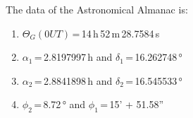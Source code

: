 The data of the Astronomical Almanac is: 

\begin{enumerate}
    \item $\Theta_G(0UT)$\,=\,14\,h\,52\,m\,28.7584\,s
    \item $\alpha_1$\,=\,2.8197997\,h and $\delta_1$\,=\,16.262748\,°
    \item $\alpha_2$\,=\,2.8841898\,h and $\delta_2$\,=\,16.545533\,°
    \item $\phi_2$\,=\,8.72\,° and $\phi_1$\,=\,15' + 51.58''
\end{enumerate}


%
%
